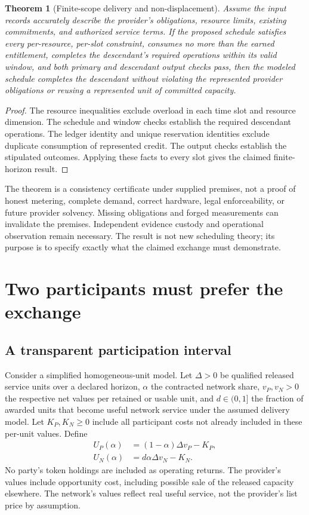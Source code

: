 \documentclass[11pt,letterpaper]{article}
\newtheorem{theorem}{Theorem}[section]
\theoremstyle{remark}\newtheorem{remark}{Remark}[section]
\begin{document}
\begin{theorem}[Finite-scope delivery and non-displacement]\label{thm:certificate}
Assume the input records accurately describe the provider's obligations, resource limits, existing commitments, and authorized service terms. If the proposed schedule satisfies every per-resource, per-slot constraint, consumes no more than the earned entitlement, completes the descendant's required operations within its valid window, and both primary and descendant output checks pass, then the modeled schedule completes the descendant without violating the represented provider obligations or reusing a represented unit of committed capacity.
\end{theorem}
\begin{proof}
The resource inequalities exclude overload in each time slot and resource dimension. The schedule and window checks establish the required descendant operations. The ledger identity and unique reservation identities exclude duplicate consumption of represented credit. The output checks establish the stipulated outcomes. Applying these facts to every slot gives the claimed finite-horizon result.
\end{proof}

The theorem is a consistency certificate under supplied premises, not a proof of honest metering, complete demand, correct hardware, legal enforceability, or future provider solvency. Missing obligations and forged measurements can invalidate the premises. Independent evidence custody and operational observation remain necessary. The result is not new scheduling theory; its purpose is to specify exactly what the claimed exchange must demonstrate.

\section{Two participants must prefer the exchange}
\label{sec:economics}
\subsection{A transparent participation interval}
Consider a simplified homogeneous-unit model. Let $\Delta>0$ be qualified released service units over a declared horizon, $\alpha$ the contracted network share, $v_P,v_N>0$ the respective net values per retained or usable unit, and $d\in(0,1]$ the fraction of awarded units that become useful network service under the assumed delivery model. Let $K_P,K_N\ge0$ include all participant costs not already included in these per-unit values. Define
\begin{align}
U_P(\alpha)&=(1-\alpha)\Delta v_P-K_P,\\
U_N(\alpha)&=d\alpha\Delta v_N-K_N.
\end{align}
No party's token holdings are included as operating returns. The provider's values include opportunity cost, including possible sale of the released capacity elsewhere. The network's values reflect real useful service, not the provider's list price by assumption.
\end{document}
